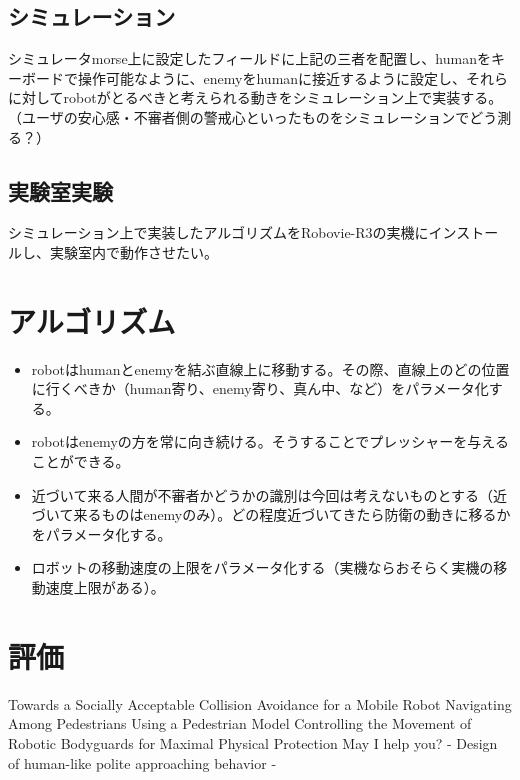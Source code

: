 \documentclass[twocolumn,12pt]{jsarticle}
\begin{document}
\subsection{シミュレーション}
シミュレータmorse上に設定したフィールドに上記の三者を配置し、humanをキーボードで操作可能なように、enemyをhumanに接近するように設定し、それらに対してrobotがとるべきと考えられる動きをシミュレーション上で実装する。
（ユーザの安心感・不審者側の警戒心といったものをシミュレーションでどう測る？）

\subsection{実験室実験}
シミュレーション上で実装したアルゴリズムをRobovie-R3の実機にインストールし、実験室内で動作させたい。

\section{アルゴリズム}
\begin{itemize}
	\item robotはhumanとenemyを結ぶ直線上に移動する。その際、直線上のどの位置に行くべきか（human寄り、enemy寄り、真ん中、など）をパラメータ化する。
	\item robotはenemyの方を常に向き続ける。そうすることでプレッシャーを与えることができる。
	\item 近づいて来る人間が不審者かどうかの識別は今回は考えないものとする（近づいて来るものはenemyのみ）。どの程度近づいてきたら防衛の動きに移るかをパラメータ化する。
	\item ロボットの移動速度の上限をパラメータ化する（実機ならおそらく実機の移動速度上限がある）。
\end{itemize}

\section{評価}





\begin{thebibliography}{3}
 Towards a Socially Acceptable Collision Avoidance for a Mobile Robot Navigating Among Pedestrians Using a Pedestrian Model
 Controlling the Movement of Robotic Bodyguards for Maximal Physical Protection
 May I help you? - Design of human-like polite approaching behavior -
\end{thebibliography}
\end{document}
